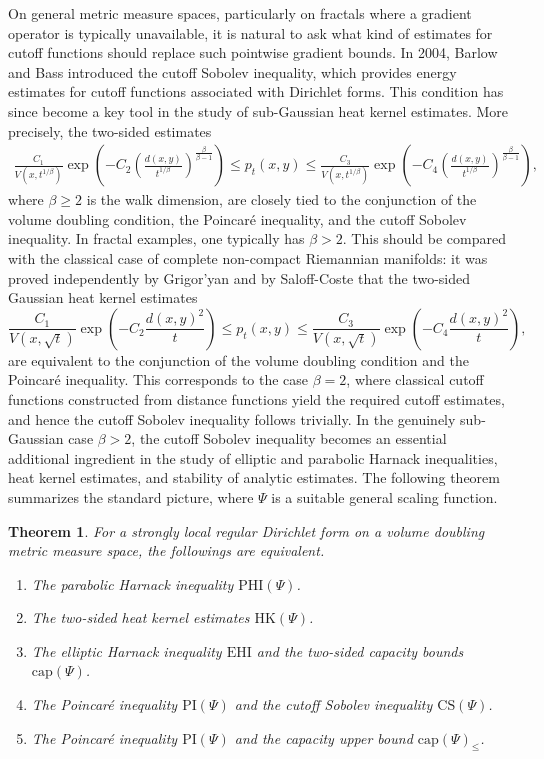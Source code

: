 \documentclass[11pt,a4paper]{article}
\numberwithin{equation}{section}
\theoremstyle{plain}
\newtheorem{theorem}{Theorem}[section]
\theoremstyle{definition}
\begin{document}
On general metric measure spaces, particularly on fractals where a gradient operator is typically unavailable, it is natural to ask what kind of estimates for cutoff functions should replace such pointwise gradient bounds. In 2004, Barlow and Bass \cite{BB04} introduced the cutoff Sobolev inequality, which provides energy estimates for cutoff functions associated with Dirichlet forms. This condition has since become a key tool in the study of sub-Gaussian heat kernel estimates. More precisely, the two-sided estimates
\begin{align*}\label{eq_HKbeta}\tag*{HK($\beta$)}
\frac{C_1}{V(x,t^{1/\beta})}\exp\left(-C_2\left(\frac{d(x,y)}{t^{1/\beta}}\right)^{\frac{\beta}{\beta-1}}\right)\le p_t(x,y)\le\frac{C_3}{V(x,t^{1/\beta})}\exp\left(-C_4\left(\frac{d(x,y)}{t^{1/\beta}}\right)^{\frac{\beta}{\beta-1}}\right),\nonumber
\end{align*}
where $\beta\ge2$ is the walk dimension, are closely tied to the conjunction of the volume doubling condition, the Poincar\'e inequality, and the cutoff Sobolev inequality. In fractal examples, one typically has $\beta>2$. This should be compared with the classical case of complete non-compact Riemannian manifolds: it was proved independently by Grigor'yan \cite{Gri92} and by Saloff-Coste \cite{Sal92,Sal95} that the two-sided Gaussian heat kernel estimates
$$\frac{C_1}{V(x,\sqrt{t})}\exp\left(-C_2\frac{d(x,y)^2}{t}\right)\le p_t(x,y)\le\frac{C_3}{V(x,\sqrt{t})}\exp\left(-C_4\frac{d(x,y)^2}{t}\right),$$
are equivalent to the conjunction of the volume doubling condition and the Poincar\'e inequality. This corresponds to the case $\beta=2$, where classical cutoff functions constructed from distance functions yield the required cutoff estimates, and hence the cutoff Sobolev inequality follows trivially. In the genuinely sub-Gaussian case $\beta>2$, the cutoff Sobolev inequality becomes an essential additional ingredient in the study of elliptic and parabolic Harnack inequalities, heat kernel estimates, and stability of analytic estimates. The following theorem summarizes the standard picture, where $\Psi$ is a suitable general scaling function.

\begin{theorem}\label{thm_DF}
For a strongly local regular Dirichlet form on a volume doubling metric measure space, the followings are equivalent.
\begin{enumerate}[label=(\alph*),ref=(\alph*)]
\item\label{item_PHI} The parabolic Harnack inequality $\text{PHI}(\Psi)$.
\item\label{item_HK} The two-sided heat kernel estimates $\text{HK}(\Psi)$.
\item\label{item_EHIcap} The elliptic Harnack inequality $\text{EHI}$ and the two-sided capacity bounds $\text{cap}(\Psi)$.
\item\label{item_PICS} The Poincar\'e inequality $\text{PI}(\Psi)$ and the cutoff Sobolev inequality $\text{CS}(\Psi)$.
\item\label{item_PIcap} The Poincar\'e inequality $\text{PI}(\Psi)$ and the capacity upper bound $\text{cap}(\Psi)_{\leq}$.
\end{enumerate}
\end{theorem}
\end{document}
